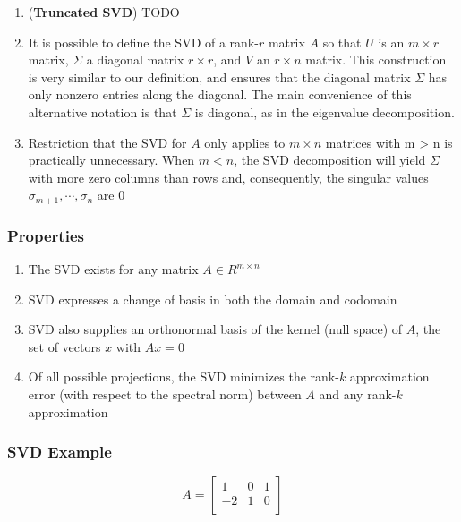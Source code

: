 \begin{enumerate}
\begin{enumerate}
\begin{enumerate}
            \item (\textbf{Truncated SVD}) TODO

            \item It is possible to define the SVD of a rank-$r$ matrix $A$ so that $U$ is an $m\times r$ matrix, $\Sigma$  a diagonal matrix $r\times r$, and $V$ an $r\times n$ matrix. This construction is very similar to our definition, and ensures that the diagonal matrix $\Sigma$  has only nonzero entries along the diagonal. The main convenience of this alternative notation is that $\Sigma$  is diagonal, as in the eigenvalue decomposition.

            \item Restriction that the SVD for $A$ only applies to $m \times  n$ matrices with m > n is practically unnecessary. When $m < n$, the SVD decomposition will yield $\Sigma$  with more zero columns than rows and, consequently, the singular values $\sigma _{m+1}, \cdots ,\sigma _{n}$ are $0$

            
        \end{enumerate}

        
    \end{enumerate}


\end{enumerate}

\subsubsection{Properties}
\begin{enumerate}
    \item The SVD exists for any matrix $A \in R^{m\times n}$

    \item SVD expresses a change of basis in both the domain and codomain

    \item SVD also supplies an orthonormal basis of the kernel (null space) of $A$, the set of vectors $x$ with $Ax = 0$

    \item Of all possible projections, the SVD minimizes the rank-$k$ approximation error (with respect to the spectral norm) between $A$ and any rank-$k$ approximation 
\end{enumerate}



\subsubsection{SVD Example}
\[
    A = \begin{bmatrix}
        1 & 0 & 1 \\
        -2 & 1 & 0 \\
    \end{bmatrix}
\]

